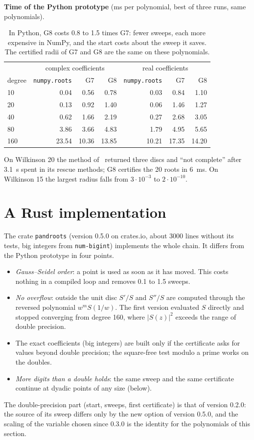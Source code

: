 \documentclass[10pt,a4paper]{article}
\theoremstyle{definition}
\numberwithin{equation}{section}
\begin{document}
\textbf{Time of the Python prototype} (ms per polynomial, best of three runs, same polynomials).
\begin{table}[H]\centering\small
\begin{tabular}{lrrr@{\qquad}rrr}
\toprule
 & \multicolumn{3}{c}{complex coefficients} & \multicolumn{3}{c}{real coefficients}\\
degree & \texttt{numpy.roots} & G7 & G8 & \texttt{numpy.roots} & G7 & G8\\
\midrule
10 & 0.04 & 0.56 & 0.78 & 0.03 & 0.84 & 1.10\\
20 & 0.13 & 0.92 & 1.40 & 0.06 & 1.46 & 1.27\\
40 & 0.62 & 1.66 & 2.19 & 0.27 & 2.68 & 3.05\\
80 & 3.86 & 3.66 & 4.83 & 1.79 & 4.95 & 5.65\\
160 & 23.54 & 10.36 & 13.85 & 10.21 & 17.35 & 14.20\\
\bottomrule
\end{tabular}
\caption{In Python, G8 costs 0.8 to 1.5 times G7: fewer sweeps, each more expensive in NumPy, and the
start costs about the sweep it saves. The certified radii of G7 and G8 are the same on these
polynomials.}
\end{table}
On Wilkinson 20 the method of~\cite{g7} returned three discs and ``not complete'' after 3.1~s spent in
its rescue methods; G8 certifies the 20 roots in 6~ms. On Wilkinson 15 the largest radius falls from
$3\cdot10^{-3}$ to $2\cdot10^{-10}$.

\section{A Rust implementation}\label{sec:rust}
The crate \texttt{pandroots} (version 0.5.0 on crates.io, about 3000 lines without its tests, big
integers from \texttt{num-bigint}) implements the whole chain. It differs from the Python prototype in
four points.
\begin{itemize}
\item \emph{Gauss--Seidel order}: a point is used as soon as it has moved. This costs nothing in a
 compiled loop and removes 0.1 to 1.5 sweeps.
\item \emph{No overflow}: outside the unit disc $S'/S$ and $S''/S$ are computed through the reversed
 polynomial $w^mS(1/w)$. The first version evaluated $S$ directly and stopped converging from degree
 160, where $|S(z)|^2$ exceeds the range of double precision.
\item The exact coefficients (big integers) are built only if the certificate asks for values beyond
 double precision; the square-free test modulo a prime works on the doubles.
\item \emph{More digits than a double holds}: the same sweep and the same certificate continue at
 dyadic points of any size (below).
\end{itemize}
The double-precision part (start, sweeps, first certificate) is that of version 0.2.0: the source of
its sweep differs only by the new option of version 0.5.0, and the scaling of the variable chosen
since 0.3.0 is the identity for the polynomials of this section.
\end{document}
